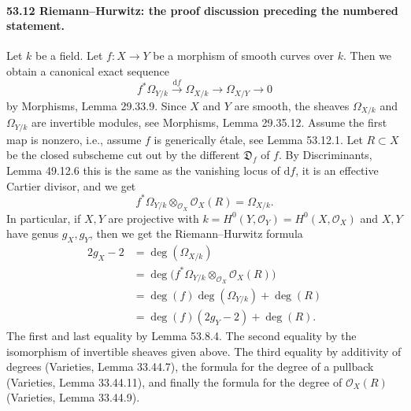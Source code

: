 \documentclass[UTF8,11pt]{ctexart}
\theoremstyle{definition}
\begin{document}
\paragraph{53.12 Riemann--Hurwitz: the proof discussion preceding the numbered statement.}
Let $k$ be a field. Let $f:X\to Y$ be a morphism of smooth curves over $k$. Then we obtain a canonical exact sequence
\[f^*\Omega_{Y/k}\xrightarrow{\mathrm df}\Omega_{X/k}\longrightarrow\Omega_{X/Y}\longrightarrow0\]
by Morphisms, Lemma 29.33.9. Since $X$ and $Y$ are smooth, the sheaves $\Omega_{X/k}$ and $\Omega_{Y/k}$ are invertible modules, see Morphisms, Lemma 29.35.12. Assume the first map is nonzero, i.e., assume $f$ is generically \'etale, see Lemma 53.12.1. Let $R\subset X$ be the closed subscheme cut out by the different $\mathfrak D_f$ of $f$. By Discriminants, Lemma 49.12.6 this is the same as the vanishing locus of $\mathrm df$, it is an effective Cartier divisor, and we get
\[f^*\Omega_{Y/k}\otimes_{\mathcal O_X}\mathcal O_X(R)=\Omega_{X/k}.\]
In particular, if $X,Y$ are projective with $k=H^0(Y,\mathcal O_Y)=H^0(X,\mathcal O_X)$ and $X,Y$ have genus $g_X,g_Y$, then we get the Riemann--Hurwitz formula
\begin{align*}
2g_X-2&=\deg(\Omega_{X/k})\\
&=\deg\bigl(f^*\Omega_{Y/k}\otimes_{\mathcal O_X}\mathcal O_X(R)\bigr)\\
&=\deg(f)\deg(\Omega_{Y/k})+\deg(R)\\
&=\deg(f)(2g_Y-2)+\deg(R).
\end{align*}
The first and last equality by Lemma 53.8.4. The second equality by the isomorphism of invertible sheaves given above. The third equality by additivity of degrees (Varieties, Lemma 33.44.7), the formula for the degree of a pullback (Varieties, Lemma 33.44.11), and finally the formula for the degree of $\mathcal O_X(R)$ (Varieties, Lemma 33.44.9).
\end{document}
